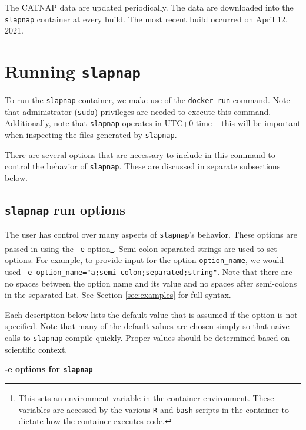 \documentclass[]{article}
\begin{document}
The CATNAP data are updated periodically. The data are downloaded into
the \texttt{slapnap} container at every build. The most recent build
occurred on April 12, 2021.

\section{\texorpdfstring{Running
\texttt{slapnap}}{Running slapnap}}\label{sec:runningcontainer}

To run the \texttt{slapnap} container, we make use of the
\href{https://docs.docker.com/engine/reference/run/}{\texttt{docker\ run}}
command. Note that administrator (\texttt{sudo}) privileges are needed
to execute this command. Additionally, note that \texttt{slapnap}
operates in UTC+0 time -- this will be important when inspecting the
files generated by \texttt{slapnap}.

There are several options that are necessary to include in this command
to control the behavior of \texttt{slapnap}. These are discussed in
separate subsections below.

\subsection{\texorpdfstring{\texttt{slapnap} run
options}{slapnap run options}}\label{sec:opts}

The user has control over many aspects of \texttt{slapnap}'s behavior.
These options are passed in using the \texttt{-e} option\footnote{This
  sets an environment variable in the container environment. These
  variables are accessed by the various \texttt{R} and \texttt{bash}
  scripts in the container to dictate how the container executes code.}.
Semi-colon separated strings are used to set options. For example, to
provide input for the option \texttt{option\_name}, we would used
\texttt{-e\ option\_name="a;semi-colon;separated;string"}. Note that
there are no spaces between the option name and its value and no spaces
after semi-colons in the separated list. See Section \ref{sec:examples}
for full syntax.

Each description below lists the default value that is assumed if the
option is not specified. Note that many of the default values are chosen
simply so that naive calls to \texttt{slapnap} compile quickly. Proper
values should be determined based on scientific context.

\textbf{-e options for \texttt{slapnap}}
\end{document}

